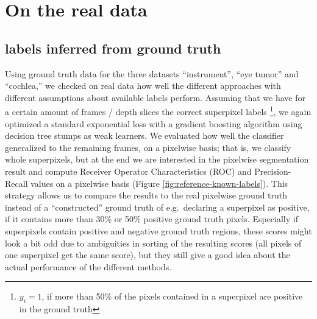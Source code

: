 \section{On the real data}
\subsection{labels inferred from ground truth}
Using ground truth data for the three datasets ``instrument'', ``eye tumor'' and ``cochlea,'' we checked on real data how well the different approaches with different assumptions about available labels perform. 
Assuming that we have for a certain amount of frames / depth slices the correct superpixel labels \footnote{$y_i = 1$, if more than 50\% of the pixels contained in a superpixel are positive in the ground truth}, we again optimized a standard exponential loss with a gradient boosting algorithm using decision tree stumps as weak learners. 
We evaluated how well the classifier generalized to the remaining frames, on a pixelwise basis; that is, we classify whole superpixels, but at the end we are interested in the pixelwise segmentation result and compute Receiver Operator Characteristics (ROC) and Precision-Recall values on a pixelwise basis (Figure \ref{fig:reference-known-labels}). This strategy allows us to compare the results to the real pixelwise ground truth instead of a ``constructed'' ground truth of e.g.\ declaring a superpixel as positive, if it contains more than 30\% or 50\% positive ground truth pixels.
Especially if superpixels contain positive and negative ground truth regions, these scores might look a bit odd due to ambiguities in sorting of the resulting scores (all pixels of one superpixel get the same score), but they still give a good idea about the actual performance of the different methods. 

